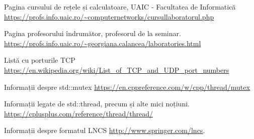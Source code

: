 \documentclass[runningheads]{llncs}
\begin{document}
\renewcommand{\refname}{Referințe bibliografice} 
\begin{thebibliography}{8}
    
    Pagina cursului de rețele și calculatoare, UAIC - Facultatea de Informatică
    \url{https://profs.info.uaic.ro/~computernetworks/cursullaboratorul.php}
    
    Pagina profesorului îndrumător, profesorul de la seminar.
    \url{https://profs.info.uaic.ro/~georgiana.calancea/laboratories.html}

    Listă cu porturile TCP
    \url{https://en.wikipedia.org/wiki/List_of_TCP_and_UDP_port_numbers}

    Informații despre std::mutex
    \url{https://en.cppreference.com/w/cpp/thread/mutex}
    
    Informații legate de std::thread, precum și alte mici noțiuni.
    \url{https://cplusplus.com/reference/thread/thread/}

    Informații despre formatul LNCS \url{http://www.springer.com/lncs}.
    \end{thebibliography}
\end{document}
